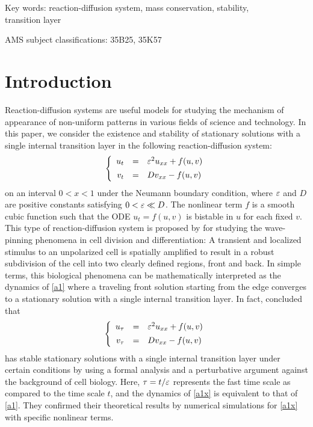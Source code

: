 \documentclass[a4,10pt]{article}
\begin{document}
\vspace{1ex}

Key words: reaction-diffusion system, mass conservation, stability, \\ 
\hspace{2.3cm} transition layer

\vspace{1ex}

AMS subject classifications: 35B25, 35K57 



\section{Introduction } \label{intoro}

Reaction-diffusion systems are useful models for studying the mechanism of appearance of non-uniform patterns in various fields of science and technology.
In this paper, we consider the existence and stability of stationary solutions with a
single internal transition layer in the following reaction-diffusion system:
%
\begin{equation}\label{a1}
\left \{
\begin{array}{rcl}
u_t & = & \varepsilon^2 u_{xx} +  f(u,v)  \\[1ex]
v_t & = & Dv_{xx}  -  f(u,v)
\end{array} 
\right.
\end{equation}
%
on an interval $0 < x < 1$ under the Neumann boundary condition, 
where $\varepsilon$ and $D$ are positive constants satisfying $0 < \varepsilon \ll D$.
The nonlinear term $f$ is a smooth cubic function such that 
the ODE $u_t = f(u, v)$ is bistable in $u$ for each fixed $v$.
This type of reaction-diffusion system is proposed by \cite{MJE1} 
for studying the wave-pinning phenomena in cell division and differentiation:
A transient and localized stimulus to 
an unpolarized cell is spatially amplified to result in a robust subdivision of the cell into
two clearly defined regions, front and back. 
In simple terms, this biological phenomena can be mathematically interpreted as 
the dynamics of \eqref{a1} where a traveling front solution starting from the edge 
converges to a stationary solution with a single internal transition layer. 
In fact, \cite{MJE1,MJE2} concluded that 
%
\begin{equation}\label{a1x}
\left \{
\begin{array}{rcl}
u_{\tau} & = & \varepsilon^2 u_{xx} +  f(u,v)  \\[1ex]
v_{\tau} & = & Dv_{xx}  -  f(u,v)
\end{array} 
\right.
\end{equation}
%
has stable stationary solutions with a single internal transition layer 
under certain conditions by using a formal analysis and a perturbative argument
against the background of cell biology.
Here, $\tau = t/\varepsilon$ represents the fast time scale as compared to the time scale $t$, 
and the dynamics of \eqref{a1x} is equivalent to that of \eqref{a1}.
They confirmed their theoretical results by numerical simulations for \eqref{a1x}
with specific nonlinear terms. 
\end{document}
